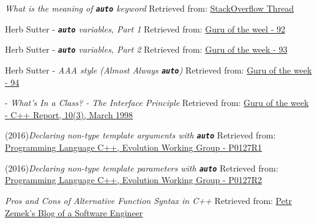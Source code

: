     \emph{What is the meaning of \texttt{\textbf{auto}} keyword}
    \newline
    Retrieved from: \href{https://stackoverflow.com/questions/7576953/what-is-the-meaning-of-the-auto-keyword}{StackOverflow Thread}

     Herb Sutter - \emph{\texttt{\textbf{auto}} variables, Part 1} 
    \newline
    Retrieved from: \href{https://herbsutter.com/2013/06/07/gotw-92-solution-auto-variables-part-1/}{Guru of the weel - 92}

     Herb Sutter - \emph{\texttt{\textbf{auto}} variables, Part 2} 
    \newline
    Retrieved from: \href{https://herbsutter.com/2013/06/13/gotw-93-solution-auto-variables-part-2/}{Guru of the week - 93}

     Herb Sutter - \emph{AAA style (Almost Always \texttt{\textbf{auto}})}
    \newline
    Retrieved from: \href{https://herbsutter.com/2013/08/12/gotw-94-solution-aaa-style-almost-always-auto/}{Guru of the week - 94}

     - \emph{What's In a Class? - The Interface Principle}
    \newline
    Retrieved from: \href{http://www.gotw.ca/publications/mill02.htm}{Guru of the week - C++ Report, 10(3), March 1998}
    
    (2016)\emph{Declaring non-type template arguments with \texttt{\textbf{auto}}}
    \newline
    Retrieved from: \href{https://open-std.org/JTC1/SC22/WG21/docs/papers/2016/p0127r1.html}{Programming Language C++, Evolution Working Group - P0127R1}

    (2016)\emph{Declaring non-type template parameters with \texttt{\textbf{auto}}}
    \newline
    Retrieved from: \href{https://isocpp.org/files/papers/p0127r2.html}{Programming Language C++, Evolution Working Group - P0127R2}

    \emph{Pros and Cons of Alternative Function Syntax in C++}
    \newline
    Retrieved from: \href{https://blog.petrzemek.net/2017/01/17/pros-and-cons-of-alternative-function-syntax-in-cpp/}{Petr Zemek's Blog of a Software Engineer}

